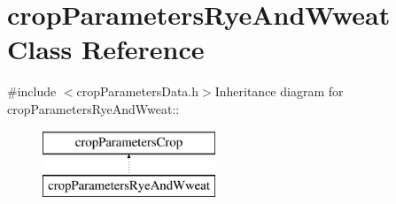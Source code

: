 \hypertarget{classcrop_parameters_rye_and_wweat}{
\section{cropParametersRyeAndWweat Class Reference}
\label{classcrop_parameters_rye_and_wweat}
}


{\ttfamily \#include $<$cropParametersData.h$>$}Inheritance diagram for cropParametersRyeAndWweat::\begin{figure}[H]
\begin{center}
\leavevmode
\includegraphics[height=2cm]{classcrop_parameters_rye_and_wweat}
\end{center}
\end{figure}
